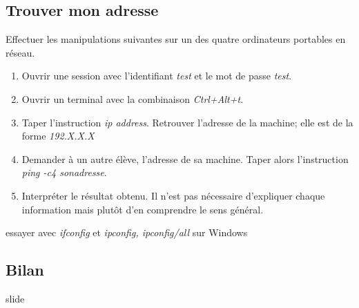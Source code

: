 \documentclass[a4paper,11pt]{article}
\begin{document}
\begin{Form}
\subsection{Trouver mon adresse}
Effectuer les manipulations suivantes sur un des quatre ordinateurs portables en réseau.
\begin{enumerate}
\item Ouvrir une session avec l'identifiant \emph{test} et le mot de passe \emph{test}.
\item Ouvrir un terminal avec la combinaison \emph{Ctrl+Alt+t}.
\item Taper l'instruction \emph{ip address}. Retrouver l'adresse de la machine; elle est de la forme \emph{192.X.X.X}
\item Demander à un autre élève, l'adresse de sa machine. Taper alors l'instruction \emph{ping -c4 sonadresse}.
\item Interpréter le résultat obtenu. Il n'est pas nécessaire d'expliquer chaque information mais plutôt d'en comprendre le sens général.
\end{enumerate}
\begin{commentprof}
essayer avec \emph{ifconfig} et \emph{ipconfig, ipconfig/all} sur Windows
\end{commentprof}
\begin{commentprof}
\section*{Bilan}
slide
\end{commentprof}
\end{Form}
\end{document}

